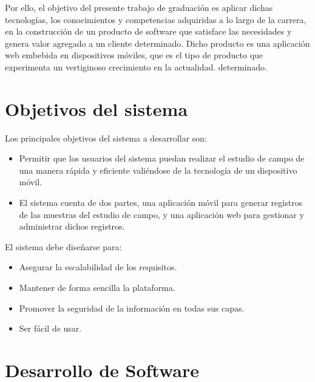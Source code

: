 Por ello, el objetivo del presente trabajo de graduación es aplicar dichas tecnologías, los conocimientos y competencias adquiridas a lo largo de la carrera, en la construcción de un producto de software que satisface las necesidades y genera valor agregado a un cliente determinado. Dicho producto es una aplicación web embebida en dispositivos móviles, que es el tipo de producto que experimenta un vertiginoso crecimiento en la actualidad.
determinado. 

\section{Objetivos del sistema}

Los principales objetivos del sistema a desarrollar son:

\begin{itemize}
    \item Permitir que los usuarios del sistema puedan realizar el estudio de campo de una manera rápida y eficiente valiéndose de la tecnología de un dispositivo móvil.
    \item El sistema cuenta de dos partes, una aplicación móvil para generar registros de las muestras del estudio de campo, y una aplicación web para gestionar y administrar dichos registros.
\end{itemize}

El sistema debe diseñarse para:

\begin{itemize}
    \item Asegurar la escalabilidad de los requisitos.
    \item Mantener de forma sencilla la plataforma.
    \item Promover la seguridad de la información en todas sus capas.
    \item Ser fácil de usar.
\end{itemize}

\section{Desarrollo de Software}



